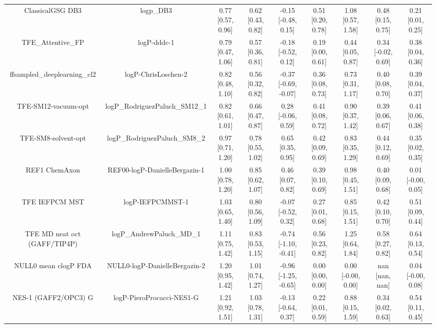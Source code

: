 \documentclass{article}
\begin{document}
\begin{center}
\begin{longtable}{|ccccccccc|}
             ClassicalGSG DB3 &                                      logp\_DB3 &  0.77 [0.57, 0.96] &  0.62 [0.43, 0.82] &   -0.15 [-0.48, 0.15] &  0.51 [0.20, 0.78] &     1.08 [0.57, 1.58] &     0.48 [0.15, 0.75] &     0.21 [0.01, 0.25] \\
             TFE_Attentive_FP &                                    logP-dddc-1 &  0.79 [0.47, 1.06] &  0.57 [0.36, 0.81] &   -0.18 [-0.52, 0.12] &  0.19 [0.00, 0.61] &     0.44 [0.05, 0.87] &    0.34 [-0.02, 0.69] &     0.38 [0.04, 0.36] \\
   ffsampled_deeplearning_cl2 &                            logP-ChrisLoschen-2 &  0.82 [0.48, 1.10] &  0.56 [0.32, 0.82] &  -0.37 [-0.69, -0.07] &  0.36 [0.08, 0.73] &     0.73 [0.31, 1.17] &     0.40 [0.08, 0.70] &     0.39 [0.04, 0.37] \\
          TFE-SM12-vacuum-opt &                 logP\_RodriguezPaluch\_SM12\_1 &  0.82 [0.61, 1.01] &  0.66 [0.47, 0.87] &    0.28 [-0.06, 0.59] &  0.41 [0.08, 0.72] &     0.90 [0.37, 1.42] &     0.39 [0.06, 0.67] &     0.41 [0.06, 0.38] \\
          TFE-SM8-solvent-opt &                  logP\_RodriguezPaluch\_SM8\_2 &  0.97 [0.71, 1.20] &  0.78 [0.55, 1.02] &     0.65 [0.35, 0.95] &  0.42 [0.09, 0.69] &     0.83 [0.35, 1.29] &     0.44 [0.12, 0.69] &     0.35 [0.02, 0.35] \\
                REF1 ChemAxon &                  REF00-logP-DanielleBergazin-1 &  1.00 [0.78, 1.20] &  0.85 [0.62, 1.07] &     0.46 [0.07, 0.82] &  0.39 [0.10, 0.69] &     0.98 [0.45, 1.51] &     0.40 [0.09, 0.68] &    0.01 [-0.00, 0.05] \\
               TFE IEFPCM MST &                               logP-IEFPCMMST-1 &  1.03 [0.65, 1.40] &  0.80 [0.56, 1.09] &   -0.07 [-0.52, 0.32] &  0.27 [0.01, 0.68] &     0.85 [0.15, 1.51] &     0.42 [0.10, 0.70] &     0.51 [0.09, 0.44] \\
 TFE MD neat oct (GAFF/TIP4P) &                      logP\_AndrewPaluch\_MD\_1 &  1.11 [0.75, 1.42] &  0.83 [0.53, 1.15] &  -0.74 [-1.10, -0.41] &  0.56 [0.23, 0.82] &     1.25 [0.64, 1.84] &     0.58 [0.27, 0.82] &     0.64 [0.13, 0.54] \\
         NULL0 mean clogP FDA &                  NULL0-logP-DanielleBergazin-2 &  1.20 [0.95, 1.42] &  1.01 [0.74, 1.27] &  -0.96 [-1.25, -0.65] &  0.00 [0.00, 0.00] &    0.00 [-0.00, 0.00] &        nan [nan, nan] &    0.04 [-0.00, 0.08] \\
         NES-1 (GAFF2/OPC3) G &                      logP-PieroProcacci-NES1-G &  1.21 [0.92, 1.51] &  1.03 [0.78, 1.31] &   -0.13 [-0.64, 0.37] &  0.22 [0.01, 0.59] &     0.88 [0.15, 1.59] &     0.34 [0.02, 0.63] &     0.54 [0.11, 0.45] \\

\end{longtable}
\end{center}
\end{document}
